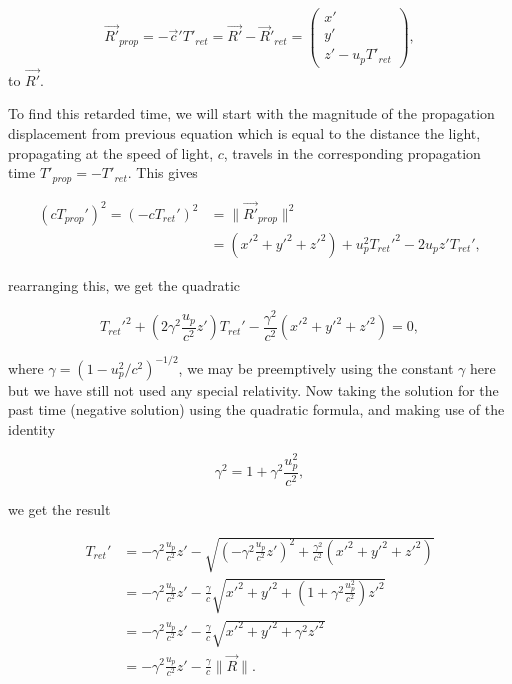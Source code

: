 \begin{equation}%
\label{displacement}
    \Vec{R'}_{prop} = -\Vec{c}'T'_{ret} = \Vec{R'} - \vec{R}'_{ret} =  \begin{pmatrix}
    x'\\ y' \\ z' - u_p T'_{ret}
    \end{pmatrix},
\end{equation}%
to $\Vec{R'}$.

To find this retarded time, we will start with the magnitude of the propagation displacement from previous equation which is equal to the distance the light, propagating at the speed of light, $c$, travels in the corresponding propagation time $T'_{prop}=-T'_{ret}$. This gives

\begin{equation}%
        \begin{aligned}
        \left( c T_{prop}'\right)^2  = \left( -c T_{ret}'\right)^2 &= \|\Vec{R'}_{prop}\|^2 \\
        &= (x'^2 + y'^2 + z'^2) + u_p^2 T_{ret}'^2 - 2u_p z' T_{ret}',
        \end{aligned}
\end{equation}%

rearranging this, we get the quadratic

\begin{equation}%
        T_{ret}'^{2} + \left(2\gamma^2\frac{u_p}{c^2} z'\right)T_{ret}' - \frac{\gamma^2}{c^2}(x'^2+y'^2+z'^2) = 0,
\end{equation}%

where $\gamma = (1 - u_p^2/c^2)^{-1/2}$, we may be preemptively using the constant $\gamma$ here but we have still not used any special relativity. Now taking the solution for the past time (negative solution) using the quadratic formula, and making use of the identity

\begin{equation}%
\label{eq: gamma identity}
    \gamma^2 = 1+\gamma^2\frac{u_p^2}{c^2},
\end{equation}%

we get the result

\begin{equation}%
\label{Retarded Time}
    \begin{aligned}
    T_{ret}' &= -\gamma^2\frac{u_p}{c^2}z' - \sqrt{\left(-\gamma^2\frac{u_p}{c^2} z'\right)^2+\frac{\gamma^2}{c^2}(x'^2+y'^2+z'^2)} \\
    &= -\gamma^2\frac{u_p}{c^2}z' - \frac{\gamma}{c}\sqrt{x'^2+y'^2+\left(1+\gamma^2\frac{u_p^2}{c^2}\right) z'^2}\\
    &= - \gamma^2\frac{u_p}{c^2}z' - \frac{\gamma}{c}\sqrt{x'^2+y'^2+\gamma^2 z'^2} \\
    &= - \gamma^2\frac{u_p}{c^2}z' - \frac{\gamma}{c}\|\vec{R}\|.
    \end{aligned}
\end{equation}%


